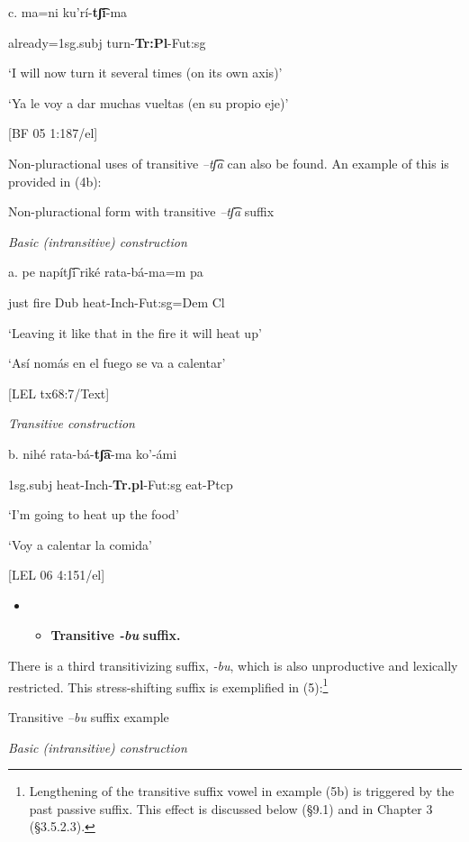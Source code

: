 c.  ma=ni      ku’rí-\textbf{tʃ͡i}{}-ma

already=1sg.subj    turn-\textbf{Tr:Pl}{}-Fut:sg

‘I will now turn it several times (on its own axis)’  

‘Ya le voy a dar muchas vueltas (en su propio eje)’  

[BF 05 1:187/el]

  Non-pluractional uses of transitive \textit{–tʃ͡a} can also be found. An example of this is provided in (4b):

    Non-pluractional form with transitive \textit{–tʃ͡a} suffix  

  \textit{Basic (intransitive) construction}

a.   pe   napítʃ͡i   riké   rata-bá-ma=m     pa

    just  fire  Dub  heat-Inch-Fut:sg=Dem  Cl

    ‘Leaving it like that in the fire it will heat up’

    ‘Así nomás en el fuego se va a calentar’    

    [LEL tx68:7/Text]

  \textit{Transitive construction}

b.   nihé   rata-bá-\textbf{tʃ͡a}{}-ma       ko’-ámi

1sg.subj  heat-Inch-\textbf{Tr.pl}{}-Fut:sg  eat-Ptcp

‘I’m going to heat up the food’

‘Voy a calentar la comida’        

[LEL 06 4:151/el]

\begin{itemize}
\item \begin{itemize}
\item \textbf{Transitive \textit{{}-bu} }\textbf{suffix.}
\end{itemize}
\end{itemize}

There is a third transitivizing suffix, \textit{{}-bu}, which is also unproductive and lexically restricted. This stress-shifting suffix is exemplified in (5):\footnote{Lengthening of the transitive suffix vowel in example (5b) is triggered by the past passive suffix. This effect is discussed below (§9.1) and in Chapter 3 (§3.5.2.3).}

  Transitive \textit{–bu} suffix example

  \textit{Basic (intransitive) construction}

